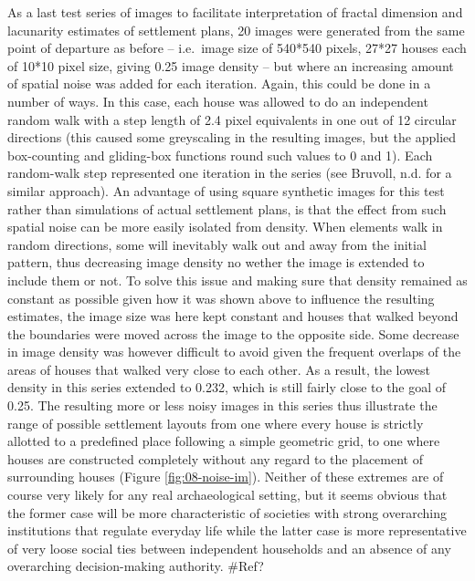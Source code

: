 \documentclass[
  12pt,
  a4paper, twoside]{book}
\begin{document}
As a last test series of images to facilitate interpretation of fractal dimension and lacunarity estimates of settlement plans, 20 images were generated from the same point of departure as before -- i.e.~image size of 540*540 pixels, 27*27 houses each of 10*10 pixel size, giving 0.25 image density -- but where an increasing amount of spatial noise was added for each iteration. Again, this could be done in a number of ways. In this case, each house was allowed to do an independent random walk with a step length of 2.4 pixel equivalents in one out of 12 circular directions (this caused some greyscaling in the resulting images, but the applied box-counting and gliding-box functions round such values to 0 and 1). Each random-walk step represented one iteration in the series (see Bruvoll, n.d. for a similar approach). An advantage of using square synthetic images for this test rather than simulations of actual settlement plans, is that the effect from such spatial noise can be more easily isolated from density. When elements walk in random directions, some will inevitably walk out and away from the initial pattern, thus decreasing image density no wether the image is extended to include them or not. To solve this issue and making sure that density remained as constant as possible given how it was shown above to influence the resulting estimates, the image size was here kept constant and houses that walked beyond the boundaries were moved across the image to the opposite side. Some decrease in image density was however difficult to avoid given the frequent overlaps of the areas of houses that walked very close to each other. As a result, the lowest density in this series extended to 0.232, which is still fairly close to the goal of 0.25. The resulting more or less noisy images in this series thus illustrate the range of possible settlement layouts from one where every house is strictly allotted to a predefined place following a simple geometric grid, to one where houses are constructed completely without any regard to the placement of surrounding houses (Figure \ref{fig:08-noise-im}). Neither of these extremes are of course very likely for any real archaeological setting, but it seems obvious that the former case will be more characteristic of societies with strong overarching institutions that regulate everyday life while the latter case is more representative of very loose social ties between independent households and an absence of any overarching decision-making authority. \#Ref?
\end{document}
